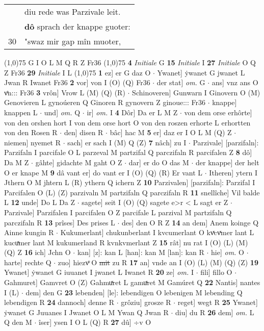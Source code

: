 \documentclass[8pt,a4paper,notitlepage]{article}
\begin{document}
\begin{table}[ht]
\begin{minipage}[t]{0.5\linewidth}
\begin{tabular}{rl}
 & diu rede was Parzivale leit.\\ 
 & \textbf{dô} sprach der knappe guoter:\\ 
30 & "swaz mir gap mîn muoter,\\ 
\end{tabular}
\scriptsize
\line(1,0){75} \newline
G I O L M Q R Z Fr36 \newline
\line(1,0){75} \newline
\textbf{4} \textit{Initiale} G  \textbf{15} \textit{Initiale} I  \textbf{27} \textit{Initiale} O Q Z Fr36  \textbf{29} \textit{Initiale} I L  \newline
\line(1,0){75} \newline
\textbf{1} ez] er G daz O  $\cdot$ Ywanet] ẏwanet G jwanet L Jwan R Iwanet Fr36 \textbf{2} vor] von I (O) (Q) Fr36  $\cdot$ der stat] \textit{om.} G  $\cdot$ ans] vnz ans O vͤn::: Fr36 \textbf{3} vrôn] Vrow L (M) (Q) (R)  $\cdot$ Schinoveren] Gunwarn I Ginovern O (M) Genovieren L gynoúeren Q Ginoren R gynovern Z ginoue::: Fr36  $\cdot$ knappe] knappen L  $\cdot$ und] \textit{om.} Q  $\cdot$ ir] \textit{om.} I \textbf{4} Dôr] Da er L M Z  $\cdot$ von dem orse erhôrte] von den orshen hort I von dem orse hort O von den roszen erhorte L erhortten von den Rosen R  $\cdot$ den] disen R  $\cdot$ bâc] hac M \textbf{5} er] daz er I O L M (Q) Z  $\cdot$ niemen] nyemet R  $\cdot$ sach] er sach I (M) Q (Z) \textbf{7} nâch] zu I  $\cdot$ Parzivale] [parzifaln]: Parzifaln I parcifale O L parzeval M partzifal Q parczifaln R parcifalen Z \textbf{8} dô] Da M Z  $\cdot$ gâhte] gidachte M gaht O Z  $\cdot$ dar] er do O das M  $\cdot$ der knappe] der helt O er knape M \textbf{9} dâ vant er] do vant er I (O) (Q) (R) Er vant L  $\cdot$ Itheren] ytern I Jthern O M jhtern L (R) ythern Q ichern Z \textbf{10} Parzivalen] [parzifaln]: Parzifal I Parcifalen O (L) (Z) parzivaln M partzifaln Q parczifaln R \textbf{11} snellîche] Vil balde L \textbf{12} unde] Do L Da Z  $\cdot$ sagete] seit I (O) (Q) sagete e>r < L sagt er Z  $\cdot$ Parzivale] Parzifalen I parcifalen O Z parcifale L parzival M partzifaln Q parczifaln R \textbf{13} prîses] Des prises L  $\cdot$ des] den O R Z \textbf{14} an dem] Anem koinge Q Ainne kungin R  $\cdot$ Kukumerlant] chukunberlant I kvcumerlant O kvͯcvͯmer lant L kucuͯmer lant M kukumerland R kvnkvmerlant Z \textbf{15} rât] nu rat I (O) (L) (M) (Q) Z \textbf{16} ich] Jchn O  $\cdot$ kan] [z]: kan L [han]: kan M [lan]: kan R  $\cdot$ hie] \textit{om.} O  $\cdot$ harte] rechte Q  $\cdot$ zuo] hiezvͦ O \sout{mit} zu R \textbf{17} an] vnde an I (O) (L) (M) (Q) (Z) \textbf{19} Ywanet] ẏwanet G iuuanet I jwanet L Iwanet R \textbf{20} ze] \textit{om.} I  $\cdot$ fili] fillo O  $\cdot$ Gahmuret] Gamvret O (Z) Gahmuͯret L gamuͯret M Gamúret Q \textbf{22} Nantis] nantes I (L)  $\cdot$ dem] den G \textbf{23} lebenden] [le]: lebendigen O lebenigen M lebending Q lebendigen R \textbf{24} dannoch] denne R  $\cdot$ grôziu] grosze R  $\cdot$ reget] wegt R \textbf{25} Ywanet] ẏwanet G Juuanes I Jwanet O L M Ywan Q Jwan R  $\cdot$ diu] du R \textbf{26} dem] \textit{om.} L Q den M  $\cdot$ îser] ysen I O L (Q) R \textbf{27} dû] ÷v O  
\end{minipage}
\end{table}
\end{document}
